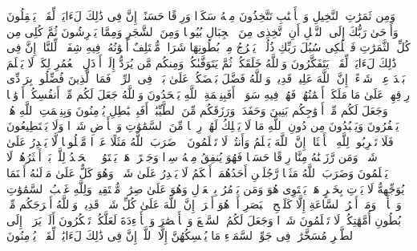 \stopbuffer
\startbuffer[\q:16:67]
وَمِن ثَمَرَٰتِ ٱلنَّخِیلِ وَٱلۡأَعۡنَٰبِ تَتَّخِذُونَ مِنۡهُ سَكَرࣰا وَرِزۡقًا حَسَنًاۚ إِنَّ فِی ذَٰلِكَ لَءَایَةࣰ لِّقَوۡمࣲ یَعۡقِلُونَ%
\stopbuffer
\startbuffer[\q:16:68]
وَأَوۡحَىٰ رَبُّكَ إِلَى ٱلنَّحۡلِ أَنِ ٱتَّخِذِی مِنَ ٱلۡجِبَالِ بُیُوتࣰا وَمِنَ ٱلشَّجَرِ وَمِمَّا یَعۡرِشُونَ%
\stopbuffer
\startbuffer[\q:16:69]
ثُمَّ كُلِی مِن كُلِّ ٱلثَّمَرَٰتِ فَٱسۡلُكِی سُبُلَ رَبِّكِ ذُلُلࣰاۚ یَخۡرُجُ مِنۢ بُطُونِهَا شَرَابࣱ مُّخۡتَلِفٌ أَلۡوَٰنُهُۥ فِیهِ شِفَاۤءࣱ لِّلنَّاسِۚ إِنَّ فِی ذَٰلِكَ لَءَایَةࣰ لِّقَوۡمࣲ یَتَفَكَّرُونَ%
\stopbuffer
\startbuffer[\q:16:70]
وَٱللَّهُ خَلَقَكُمۡ ثُمَّ یَتَوَفَّىٰكُمۡۚ وَمِنكُم مَّن یُرَدُّ إِلَىٰۤ أَرۡذَلِ ٱلۡعُمُرِ لِكَیۡ لَا یَعۡلَمَ بَعۡدَ عِلۡمࣲ شَیۡءًاۚ إِنَّ ٱللَّهَ عَلِیمࣱ قَدِیرࣱ%
\stopbuffer
\startbuffer[\q:16:71]
وَٱللَّهُ فَضَّلَ بَعۡضَكُمۡ عَلَىٰ بَعۡضࣲ فِی ٱلرِّزۡقِۚ فَمَا ٱلَّذِینَ فُضِّلُوا۟ بِرَاۤدِّی رِزۡقِهِمۡ عَلَىٰ مَا مَلَكَتۡ أَیۡمَٰنُهُمۡ فَهُمۡ فِیهِ سَوَاۤءٌۚ أَفَبِنِعۡمَةِ ٱللَّهِ یَجۡحَدُونَ%
\stopbuffer
\startbuffer[\q:16:72]
وَٱللَّهُ جَعَلَ لَكُم مِّنۡ أَنفُسِكُمۡ أَزۡوَٰجࣰا وَجَعَلَ لَكُم مِّنۡ أَزۡوَٰجِكُم بَنِینَ وَحَفَدَةࣰ وَرَزَقَكُم مِّنَ ٱلطَّیِّبَٰتِۚ أَفَبِٱلۡبَٰطِلِ یُؤۡمِنُونَ وَبِنِعۡمَتِ ٱللَّهِ هُمۡ یَكۡفُرُونَ%
\stopbuffer
\startbuffer[\q:16:73]
وَیَعۡبُدُونَ مِن دُونِ ٱللَّهِ مَا لَا یَمۡلِكُ لَهُمۡ رِزۡقࣰا مِّنَ ٱلسَّمَٰوَٰتِ وَٱلۡأَرۡضِ شَیۡءࣰا وَلَا یَسۡتَطِیعُونَ%
\stopbuffer
\startbuffer[\q:16:74]
فَلَا تَضۡرِبُوا۟ لِلَّهِ ٱلۡأَمۡثَالَۚ إِنَّ ٱللَّهَ یَعۡلَمُ وَأَنتُمۡ لَا تَعۡلَمُونَ%
\stopbuffer
\startbuffer[\q:16:75]
۞ ضَرَبَ ٱللَّهُ مَثَلًا عَبۡدࣰا مَّمۡلُوكࣰا لَّا یَقۡدِرُ عَلَىٰ شَیۡءࣲ وَمَن رَّزَقۡنَٰهُ مِنَّا رِزۡقًا حَسَنࣰا فَهُوَ یُنفِقُ مِنۡهُ سِرࣰّا وَجَهۡرًاۖ هَلۡ یَسۡتَوُۥنَۚ ٱلۡحَمۡدُ لِلَّهِۚ بَلۡ أَكۡثَرُهُمۡ لَا یَعۡلَمُونَ%
\stopbuffer
\startbuffer[\q:16:76]
وَضَرَبَ ٱللَّهُ مَثَلࣰا رَّجُلَیۡنِ أَحَدُهُمَاۤ أَبۡكَمُ لَا یَقۡدِرُ عَلَىٰ شَیۡءࣲ وَهُوَ كَلٌّ عَلَىٰ مَوۡلَىٰهُ أَیۡنَمَا یُوَجِّههُّ لَا یَأۡتِ بِخَیۡرٍ هَلۡ یَسۡتَوِی هُوَ وَمَن یَأۡمُرُ بِٱلۡعَدۡلِ وَهُوَ عَلَىٰ صِرَٰطࣲ مُّسۡتَقِیمࣲ%
\stopbuffer
\startbuffer[\q:16:77]
وَلِلَّهِ غَیۡبُ ٱلسَّمَٰوَٰتِ وَٱلۡأَرۡضِۚ وَمَاۤ أَمۡرُ ٱلسَّاعَةِ إِلَّا كَلَمۡحِ ٱلۡبَصَرِ أَوۡ هُوَ أَقۡرَبُۚ إِنَّ ٱللَّهَ عَلَىٰ كُلِّ شَیۡءࣲ قَدِیرࣱ%
\stopbuffer
\startbuffer[\q:16:78]
وَٱللَّهُ أَخۡرَجَكُم مِّنۢ بُطُونِ أُمَّهَٰتِكُمۡ لَا تَعۡلَمُونَ شَیۡءࣰا وَجَعَلَ لَكُمُ ٱلسَّمۡعَ وَٱلۡأَبۡصَٰرَ وَٱلۡأَفۡءِدَةَ لَعَلَّكُمۡ تَشۡكُرُونَ%
\stopbuffer
\startbuffer[\q:16:79]
أَلَمۡ یَرَوۡا۟ إِلَى ٱلطَّیۡرِ مُسَخَّرَٰتࣲ فِی جَوِّ ٱلسَّمَاۤءِ مَا یُمۡسِكُهُنَّ إِلَّا ٱللَّهُۚ إِنَّ فِی ذَٰلِكَ لَءَایَٰتࣲ لِّقَوۡمࣲ یُؤۡمِنُونَ%
